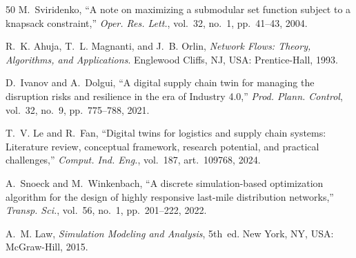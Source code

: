 \documentclass[journal]{IEEEtran}
\begin{document}
\begin{thebibliography}{50}
 M.~Sviridenko, ``A note on maximizing a submodular set function subject to a knapsack constraint,'' \emph{Oper. Res. Lett.}, vol.~32, no.~1, pp.~41--43, 2004.

 R.~K. Ahuja, T.~L. Magnanti, and J.~B. Orlin, \emph{Network Flows: Theory, Algorithms, and Applications}. Englewood Cliffs, NJ, USA: Prentice-Hall, 1993.

 D.~Ivanov and A.~Dolgui, ``A digital supply chain twin for managing the disruption risks and resilience in the era of Industry 4.0,'' \emph{Prod. Plann. Control}, vol.~32, no.~9, pp.~775--788, 2021.

 T.~V. Le and R.~Fan, ``Digital twins for logistics and supply chain systems: Literature review, conceptual framework, research potential, and practical challenges,'' \emph{Comput. Ind. Eng.}, vol.~187, art.~109768, 2024.

 A.~Snoeck and M.~Winkenbach, ``A discrete simulation-based optimization algorithm for the design of highly responsive last-mile distribution networks,'' \emph{Transp. Sci.}, vol.~56, no.~1, pp.~201--222, 2022.

 A.~M. Law, \emph{Simulation Modeling and Analysis}, 5th~ed. New York, NY, USA: McGraw-Hill, 2015.
\end{thebibliography}
\end{document}
